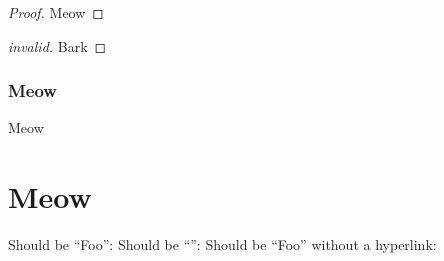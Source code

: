 \documentclass{article}
\begin{document}
%

\begin{proof}
  Meow
\end{proof}

\begin{proof}[invalid]
  Bark
\end{proof}


\subsubsection{Meow}
Meow

\section{Meow}
\label{sec:meow}

\begin{lemma}[Foo] \label{lem:foo} \end{lemma}
\begin{lemma} \label{lem:anon} \end{lemma}

Should be ``Foo'': 
Should be ``'': 
Should be ``Foo'' without a hyperlink: 

%
\end{document}
